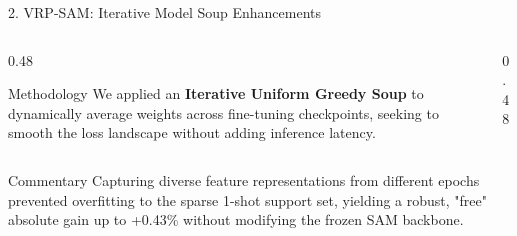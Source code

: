 \documentclass[aspectratio=169, 10pt]{beamer}
\begin{document}
\begin{frame}{2. VRP-SAM: Iterative Model Soup Enhancements}
    \begin{columns}[T]
        \begin{column}{0.48\textwidth}
            \begin{block}{Methodology}
                We applied an \textbf{Iterative Uniform Greedy Soup} to dynamically average weights across fine-tuning checkpoints, seeking to smooth the loss landscape without adding inference latency.
            \end{block}
        \end{column}
        \begin{column}{0.48\textwidth}
            \begin{table}
                \caption{Model Soup Gains on COCO (mIoU \%)}
            \end{table}
        \end{column}
    \end{columns}
    
    \vspace{0.1cm}
    \begin{alertblock}{Commentary}
        \footnotesize Capturing diverse feature representations from different epochs prevented overfitting to the sparse 1-shot support set, yielding a robust, "free" absolute gain up to +0.43\% without modifying the frozen SAM backbone.
    \end{alertblock}
\end{frame}
\end{document}
